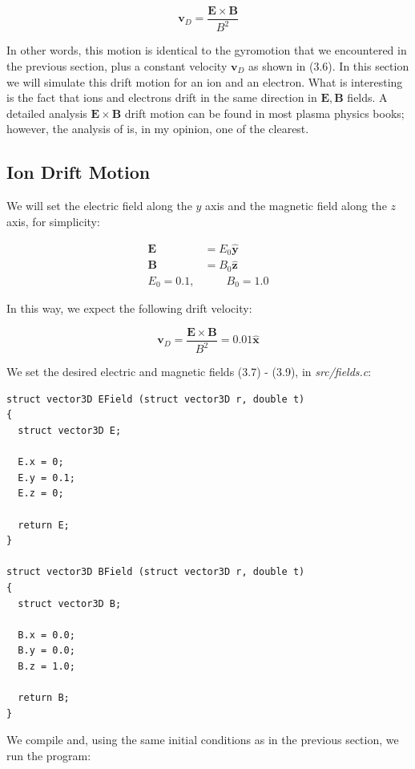 \documentclass[11pt]{report}
\begin{document}
\begin{equation}
\bm{v}_D = \frac{\bm{E} \times \bm{B}}{B^2}
\end{equation}

In other words, this motion is identical to the gyromotion that we encountered in the previous section, plus a constant velocity $\bm{v}_D$ as shown in (3.6). In this section we will simulate this drift motion for an ion and an electron. What is interesting is the fact that ions and electrons drift in the same direction in $\bm{E}, \bm{B}$ fields. A detailed analysis $\bm{E} \times \bm{B}$ drift motion can be found in most plasma physics books; however, the analysis of \cite{freidberg} is, in my opinion, one of the clearest.

\subsection{Ion Drift Motion}
We will set the electric field along the $y$ axis and the magnetic field along the $z$ axis, for simplicity:

\begin{align}
\bm{E} & = E_0 \hat{\bm{y}} \\
\bm{B} & = B_0 \hat{\bm{z}}\\
E_0 = 0.1, & \quad \quad B_0 = 1.0
\end{align}

In this way, we expect the following drift velocity:

\begin{equation}
\bm{v}_D = \frac{\bm{E} \times \bm{B}}{B^2} = 0.01 \hat{\bm{x}}
\end{equation}

We set the desired electric and magnetic fields (3.7) - (3.9), in \emph{src/fields.c}:

\begin{lstlisting}
struct vector3D EField (struct vector3D r, double t)
{
  struct vector3D E;

  E.x = 0;
  E.y = 0.1;
  E.z = 0;

  return E;
}

struct vector3D BField (struct vector3D r, double t)
{
  struct vector3D B;

  B.x = 0.0;
  B.y = 0.0;
  B.z = 1.0;

  return B;
}
\end{lstlisting}

We compile and, using the same initial conditions as in the previous section, we run the program:
\end{document}
